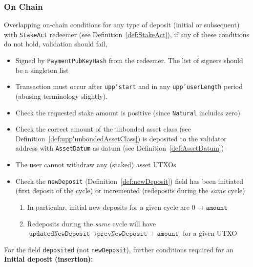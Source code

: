 \documentclass[10pt, a4paper]{article}
\theoremstyle{definition}
\begin{document}
\subsubsection{On Chain}\label{subsubsection:userStakeOnchain}
Overlapping on-chain conditions for any type of deposit (initial or subsequent) with \texttt{StakeAct} redeemer (see Definition~\ref{def:StakeAct}), if any of these conditions do not hold, validation should fail,

\begin{itemize}
\item{Signed by \texttt{PaymentPubKeyHash} from the redeemer. The list of signers should be a singleton list}
\item{Transaction must occur after \texttt{upp'start} and in any \texttt{upp'userLength} period (abusing terminology slightly).}
\item{Check the requested stake amount is positive (since \texttt{Natural} includes zero)}
\item{Check the correct amount of the unbonded asset class (see Definition~\ref{def:upp'unbondedAssetClass}) is deposited to the validator address with \texttt{AssetDatum} as datum (see Definition~\ref{def:AssetDatum})}
\item{The user cannot withdraw any (staked) asset UTXOs}
\item{Check the \texttt{newDeposit} (Definition~\ref{def:newDeposit}) field has been initiated (first deposit of the cycle) or incremented (redeposits during the \textit{same} cycle)
\begin{enumerate}
\item{In particular, initial new deposits for a given cycle are $0 \rightarrow \texttt{amount}$}
\item{Redeposits during the \textit{same} cycle will have $\texttt{updatedNewDeposit} \rightarrow \texttt{prevNewDeposit + amount}$ for a given UTXO}
\end{enumerate}}
\end{itemize}
For the field \texttt{deposited} (not \texttt{newDeposit}), further conditions required for an \textbf{Initial deposit (insertion):}
\end{document}

